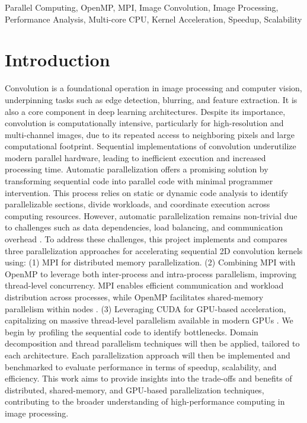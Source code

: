 \documentclass[conference, 10pt]{IEEEtran}
\begin{document}
\begin{IEEEkeywords}
Parallel Computing, OpenMP, MPI, Image Convolution, Image Processing, Performance Analysis, Multi-core CPU, Kernel Acceleration, Speedup, Scalability
\end{IEEEkeywords}


\section{Introduction}
Convolution is a foundational operation in image processing and computer vision, 
underpinning tasks such as edge detection, blurring, and feature extraction. It is also a core component in deep learning architectures. 
Despite its importance, convolution is computationally intensive, particularly for high-resolution and multi-channel images, 
due to its repeated access to neighboring pixels and large computational footprint.
Sequential implementations of convolution underutilize modern parallel hardware, leading to inefficient execution and increased processing time. 
Automatic parallelization offers a promising solution by transforming sequential code into parallel code with minimal programmer intervention. 
This process relies on static or dynamic code analysis to identify parallelizable sections,
divide workloads, and coordinate execution across computing resources. 
However, automatic parallelization remains non-trivial due to challenges such as data dependencies, 
load balancing, and communication overhead \cite{hager2021hpc}.
To address these challenges, this project implements and compares three parallelization approaches 
for accelerating sequential 2D convolution kernels using: 
(1) MPI for distributed memory parallelization\cite{toth2016convolution}. 
(2) Combining MPI with OpenMP to leverage both inter-process and intra-process parallelism, improving thread-level concurrency.
MPI enables efficient communication and workload distribution across processes, 
while OpenMP facilitates shared-memory parallelism within nodes \cite{farber2011openmp}. 
(3) Leveraging CUDA for GPU-based acceleration,
capitalizing on massive thread-level parallelism available in modern GPUs \cite{nvidia2021cuda}.
We begin by profiling the sequential code to identify bottlenecks. 
Domain decomposition and thread parallelism techniques will then be applied, tailored to each architecture. 
Each parallelization approach will then be implemented and benchmarked 
to evaluate performance in terms of speedup, scalability, and efficiency.
This work aims to provide insights into the trade-offs and benefits of distributed, shared-memory, and GPU-based parallelization techniques, 
contributing to the broader understanding of high-performance computing in image processing.
\end{document}
